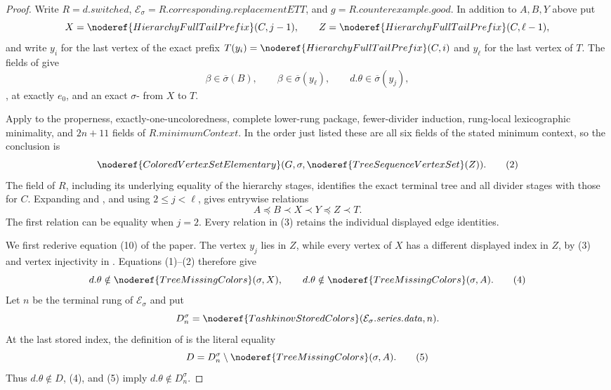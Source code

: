 \begin{proof}
Write $R=d.\mathit{switched}$,
$\mathcal E_\sigma=R.\mathit{corresponding.replacementETT}$, and
$g=R.\mathit{counterexample.good}$.  In addition to $A,B,Y$ above put
\[
 X=\noderef{HierarchyFullTailPrefix}(C,j-1),\qquad
 Z=\noderef{HierarchyFullTailPrefix}(C,\ell-1),
\]
and write $y_i$ for the last vertex of the exact prefix
$T(y_i)=\noderef{HierarchyFullTailPrefix}(C,i)$ and $y_\ell$ for the
last vertex of $T$.  The fields of
 give
\[
 \beta\in\overline\sigma(B),\qquad
 \beta\in\overline\sigma(y_\ell),\qquad
 d.\theta\in\overline\sigma(y_j),                              \tag{1}
\]
,  at exactly
$e_0$, and an exact
$\sigma$- from $X$ to $T$.

Apply  to the
properness, exactly-one-uncoloredness, complete lower-rung package,
fewer-divider induction, rung-local lexicographic minimality, and
$2n+11$ fields of $R.\mathit{minimumContext}$.  In the order just
listed these are all six fields of the stated minimum context, so the
conclusion is
\[
 \noderef{ColoredVertexSetElementary}
   (G,\sigma,\noderef{TreeSequenceVertexSet}(Z)).               \tag{2}
\]
The  field of $R$, including its underlying
equality of the hierarchy stages, identifies the exact terminal tree
and all divider stages with those for $C$.  Expanding
 and
, and using $2\le j<\ell$, gives
entrywise  relations
\[
             A\preccurlyeq B\prec X\prec Y\preccurlyeq Z\prec T. \tag{3}
\]
The first relation can be equality when $j=2$.  Every relation in (3)
retains the individual displayed edge identities.

We first rederive equation (10) of the paper.  The vertex $y_j$ lies in
$Z$, while every vertex of $X$ has a different displayed index in $Z$,
by (3) and vertex injectivity in .  Equations
(1)--(2) therefore give
\[
 d.\theta\notin\noderef{TreeMissingColors}(\sigma,X),\qquad
 d.\theta\notin\noderef{TreeMissingColors}(\sigma,A).          \tag{4}
\]
Let $n$ be the terminal rung of $\mathcal E_\sigma$ and put
\[
 D_n^\sigma=\noderef{TashkinovStoredColors}
   (\mathcal E_\sigma.\mathit{series.data},n).
\]
At the last stored index, the definition of
 is the literal equality
\[
                  D=D_n^\sigma\setminus
                     \noderef{TreeMissingColors}(\sigma,A).    \tag{5}
\]
Thus $d.\theta\notin D$, (4), and (5) imply
$d.\theta\notin D_n^\sigma$.


\end{proof}
